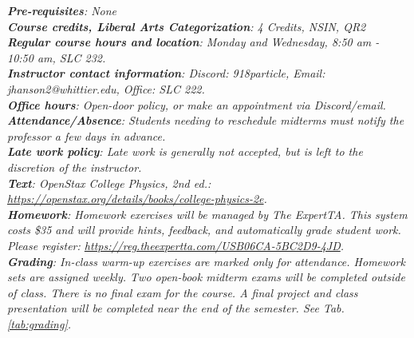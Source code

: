 \documentclass[10pt]{article}
\begin{document}
\maketitle

\begin{abstract}
The concepts of algebra-based mechanics will be presented via interactive problem-solving in an integrated lecture/laboratory format.  First, the concepts of displacement, velocity, and acceleration in one and two dimensions will be introduced, building up to Newton's Laws of motion.  Next, the concepts of friction and rotational motion will be added.  More complex problems will be introduced through the conservation of energy and linear momentum, followed by the rotational equivalents.  This course includes analytic textbook problems, peer instruction and group discussions, interactive computational exercises, and lab-based activities.  Special topics include the application of mechanics, energy, and power consumption to human physiology.
\end{abstract}
\noindent
\textit{\textbf{Pre-requisites}: None} \\
\textit{\textbf{Course credits, Liberal Arts Categorization}: 4 Credits, NSIN, QR2} \\
\textit{\textbf{Regular course hours and location}: Monday and Wednesday, 8:50 am - 10:50 am, SLC 232.} \\
\textit{\textbf{Instructor contact information}: Discord: 918particle, Email: jhanson2@whittier.edu, Office: SLC 222.} \\
\textit{\textbf{Office hours}: Open-door policy, or make an appointment via Discord/email.} \\
\textit{\textbf{Attendance/Absence}: Students needing to reschedule midterms must notify the professor a few days in advance.} \\ 
\textit{\textbf{Late work policy}: Late work is generally not accepted, but is left to the discretion of the instructor.} \\
\textit{\textbf{Text}: OpenStax College Physics, 2nd ed.: \url{https://openstax.org/details/books/college-physics-2e}.} \\
\textit{\textbf{Homework}: Homework exercises will be managed by The ExpertTA.  This system costs \$35 and will provide hints, feedback, and automatically grade student work.  Please register: \url{https://reg.theexpertta.com/USB06CA-5BC2D9-4JD}.} \\
\textit{\textbf{Grading}: In-class warm-up exercises are marked only for attendance.  Homework sets are assigned weekly.  Two open-book midterm exams will be completed outside of class.  There is no final exam for the course.  A final project and class presentation will be completed near the end of the semester.  See Tab. \ref{tab:grading}.}
\end{document}
